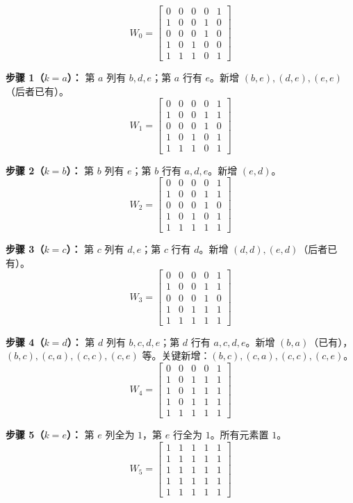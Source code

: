 \documentclass[11pt,UTF8]{article}
\begin{document}
\[
W_0 = \begin{bmatrix}
0 & 0 & 0 & 0 & 1 \\
1 & 0 & 0 & 1 & 0 \\
0 & 0 & 0 & 1 & 0 \\
1 & 0 & 1 & 0 & 0 \\
1 & 1 & 1 & 0 & 1
\end{bmatrix}
\]

\textbf{步骤 1（$k=a$）：} 第 $a$ 列有 $b,d,e$；第 $a$ 行有 $e$。新增 $(b,e),(d,e),(e,e)$（后者已有）。
\[
W_1 = \begin{bmatrix}
0 & 0 & 0 & 0 & 1 \\
1 & 0 & 0 & 1 & 1 \\
0 & 0 & 0 & 1 & 0 \\
1 & 0 & 1 & 0 & 1 \\
1 & 1 & 1 & 0 & 1
\end{bmatrix}
\]

\textbf{步骤 2（$k=b$）：} 第 $b$ 列有 $e$；第 $b$ 行有 $a,d,e$。新增 $(e,d)$。
\[
W_2 = \begin{bmatrix}
0 & 0 & 0 & 0 & 1 \\
1 & 0 & 0 & 1 & 1 \\
0 & 0 & 0 & 1 & 0 \\
1 & 0 & 1 & 0 & 1 \\
1 & 1 & 1 & 1 & 1
\end{bmatrix}
\]

\textbf{步骤 3（$k=c$）：} 第 $c$ 列有 $d,e$；第 $c$ 行有 $d$。新增 $(d,d),(e,d)$（后者已有）。
\[
W_3 = \begin{bmatrix}
0 & 0 & 0 & 0 & 1 \\
1 & 0 & 0 & 1 & 1 \\
0 & 0 & 0 & 1 & 0 \\
1 & 0 & 1 & 1 & 1 \\
1 & 1 & 1 & 1 & 1
\end{bmatrix}
\]

\textbf{步骤 4（$k=d$）：} 第 $d$ 列有 $b,c,d,e$；第 $d$ 行有 $a,c,d,e$。新增 $(b,a)$（已有），$(b,c),(c,a),(c,c),(c,e)$ 等。关键新增：$(b,c),(c,a),(c,c),(c,e)$。
\[
W_4 = \begin{bmatrix}
0 & 0 & 0 & 0 & 1 \\
1 & 0 & 1 & 1 & 1 \\
1 & 0 & 1 & 1 & 1 \\
1 & 0 & 1 & 1 & 1 \\
1 & 1 & 1 & 1 & 1
\end{bmatrix}
\]

\textbf{步骤 5（$k=e$）：} 第 $e$ 列全为 $1$，第 $e$ 行全为 $1$。所有元素置 $1$。
\[
W_5 = \begin{bmatrix}
1 & 1 & 1 & 1 & 1 \\
1 & 1 & 1 & 1 & 1 \\
1 & 1 & 1 & 1 & 1 \\
1 & 1 & 1 & 1 & 1 \\
1 & 1 & 1 & 1 & 1
\end{bmatrix}
\]
\end{document}
